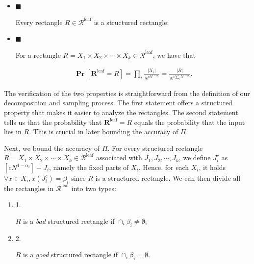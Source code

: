 \documentclass[10pt,a4paper]{article}
\begin{document}
\begin{itemize}


\item[] 
$\blacksquare$ 


Every rectangle $R\in\mathcal{R}^{\text{leaf}}$ is a structured rectangle;\par





\item[] 
$\blacksquare$ 


For a rectangle $R=X_{1}\times X_{2}\times\cdots\times X_{k}\in\mathcal{R}^{\text{leaf}}$, we have that\par


\[\begin{gathered}
\operatorname*{\mathbf{Pr}}[\bm{R}^{\text{leaf}}=R]=\prod_{i}\frac{|X_{i}|}{N^{cN^{1-\alpha_{i}}}}=\frac{|R|}{N^{c\sum_{i}N^{1-\alpha_{i}}}}.
\end{gathered}\]





\end{itemize}


The verification of the two properties is straightforward from the definition of our decomposition and sampling process. The first statement offers a structured property that makes it easier to analyze the rectangles. The second statement tells us that the probability that $\bm{R}^{\text{leaf}}=R$ equals the probability that the input lies in $R$. This is crucial in later bounding the accuracy of $\Pi$.\par




Next, we bound the accuracy of $\Pi$. For every structured rectangle $R=X_{1}\times X_{2}\times\cdots\times X_{k}\in\mathcal{R}^{\text{leaf}}$ associated with $J_{1},J_{2},\cdots,J_{k}$, we define $J_{i}^{c}$ as $[cN^{1-\alpha_{i}}]-J_{i}$, namely the fixed parts of $X_{i}$. Hence, for each $X_{i}$, it holds $\forall x\in X_{i},x(J_{i}^{c})=\beta_{i}$ since $R$ is a structured rectangle. We can then divide all the rectangles in $\mathcal{R}^{\text{leaf}}$ into two types:\par


\begin{enumerate}


\item[] 
1. 


$R$ is a \emph{bad} structured rectangle if $\cap_{i}\beta_{i}\neq\emptyset$;\par





\item[] 
2. 


$R$ is a \emph{good} structured rectangle if $\cap_{i}\beta_{i}=\emptyset$.\par





\end{enumerate}
\end{document}
